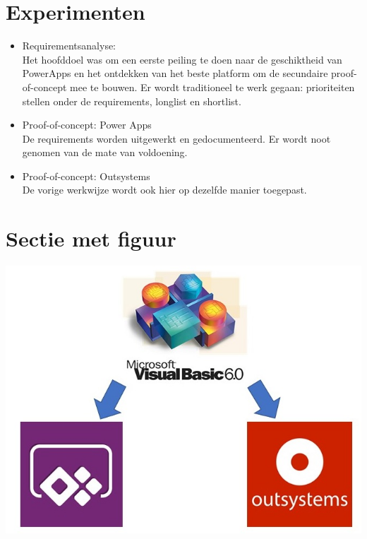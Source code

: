 \documentclass[a0,portrait]{a0poster}
\begin{document}
\begin{multicols}{2}
\section*{Experimenten}
\color{black}
\begin{itemize}
    \item Requirementsanalyse:\\
    Het hoofddoel was om een eerste peiling te doen naar de geschiktheid van PowerApps en het ontdekken van het beste platform om de secundaire proof-of-concept mee te bouwen. Er wordt traditioneel te werk gegaan: prioriteiten stellen onder de requirements, longlist en shortlist.
    \item Proof-of-concept: Power Apps\\
    De requirements worden uitgewerkt en gedocumenteerd. Er wordt noot genomen van de mate van voldoening.
    \item Proof-of-concept: Outsystems\\
    De vorige werkwijze wordt ook hier op dezelfde manier toegepast.
\end{itemize}


\color{HoGentAccent1} 
\section*{Sectie met figuur}
\color{black}


\begin{center}\vspace{1cm}
\includegraphics[width=0.7\linewidth]{plat-tri}
\end{center}\vspace{1cm}


\end{multicols}
\end{document}
